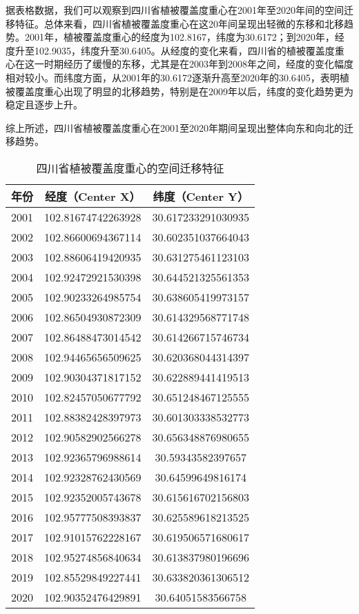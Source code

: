 \documentclass[AutoFakeBold]{LZUThesis-PgD&PhD}
\begin{document}
            
    \par 
    
    据表格数据，我们可以观察到四川省植被覆盖度重心在2001年至2020年间的空间迁移特征。总体来看，四川省植被覆盖度重心在这20年间呈现出轻微的东移和北移趋势。2001年，植被覆盖度重心的经度为102.8167，纬度为30.6172；到2020年，经度升至102.9035，纬度升至30.6405。从经度的变化来看，四川省的植被覆盖度重心在这一时期经历了缓慢的东移，尤其是在2003年到2008年之间，经度的变化幅度相对较小。而纬度方面，从2001年的30.6172逐渐升高至2020年的30.6405，表明植被覆盖度重心出现了明显的北移趋势，特别是在2009年以后，纬度的变化趋势更为稳定且逐步上升。
    
    综上所述，四川省植被覆盖度重心在2001至2020年期间呈现出整体向东和向北的迁移趋势。
    \begin{table}[H]
        \centering
        \begin{tabular}{|c|c|c|}
            \hline
            \textbf{年份} & \textbf{经度（Center X）} & \textbf{纬度（Center Y）} \\
            \hline
            2001 & 102.81674742263928 & 30.617233291030935 \\
            2002 & 102.86600694367114 & 30.602351037664043 \\
            2003 & 102.88606419420935 & 30.631275461123103 \\
            2004 & 102.92472921530398 & 30.644521325561353 \\
            2005 & 102.90233264985754 & 30.638605419973157 \\
            2006 & 102.86504930872309 & 30.614329568771748 \\
            2007 & 102.86488473014542 & 30.614266715746734 \\
            2008 & 102.94465656509625 & 30.620368044314397 \\
            2009 & 102.90304371817152 & 30.622889441419513 \\
            2010 & 102.82457050677792 & 30.651248467125555 \\
            2011 & 102.88382428397973 & 30.601303338532773 \\
            2012 & 102.90582902566278 & 30.656348876980655 \\
            2013 & 102.92365796988614 & 30.59343582397657 \\
            2014 & 102.92328762430569 & 30.64599649816174 \\
            2015 & 102.92352005743678 & 30.615616702156803 \\
            2016 & 102.95777508393837 & 30.625589618213525 \\
            2017 & 102.91015762228167 & 30.619506571680617 \\
            2018 & 102.95274856840634 & 30.613837980196696 \\
            2019 & 102.85529849227441 & 30.633820361306512 \\
            2020 & 102.90352476429891 & 30.64051583566758 \\
            \hline
        \end{tabular}
        \caption{四川省植被覆盖度重心的空间迁移特征}
    \end{table}
\end{document}
